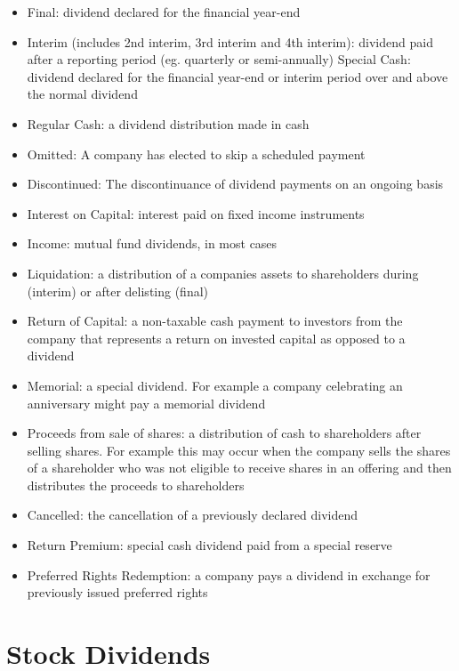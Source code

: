 \documentclass[11pt,preprint, authoryear]{elsarticle}
\numberwithin{equation}{section}
\numberwithin{figure}{section}
\numberwithin{table}{section}
\def\tightlist{} %
\begin{document}
\begin{itemize}
\tightlist
\item
  Final: dividend declared for the financial year-end
\item
  Interim (includes 2nd interim, 3rd interim and 4th interim): dividend
  paid after a reporting period (eg. quarterly or semi-annually) Special
  Cash: dividend declared for the financial year-end or interim period
  over and above the normal dividend
\item
  Regular Cash: a dividend distribution made in cash
\item
  Omitted: A company has elected to skip a scheduled payment
\item
  Discontinued: The discontinuance of dividend payments on an ongoing
  basis
\item
  Interest on Capital: interest paid on fixed income instruments
\item
  Income: mutual fund dividends, in most cases
\item
  Liquidation: a distribution of a companies assets to shareholders
  during (interim) or after delisting (final)
\item
  Return of Capital: a non-taxable cash payment to investors from the
  company that represents a return on invested capital as opposed to a
  dividend
\item
  Memorial: a special dividend. For example a company celebrating an
  anniversary might pay a memorial dividend
\item
  Proceeds from sale of shares: a distribution of cash to shareholders
  after selling shares. For example this may occur when the company
  sells the shares of a shareholder who was not eligible to receive
  shares in an offering and then distributes the proceeds to
  shareholders
\item
  Cancelled: the cancellation of a previously declared dividend
\item
  Return Premium: special cash dividend paid from a special reserve
\item
  Preferred Rights Redemption: a company pays a dividend in exchange for
  previously issued preferred rights
\end{itemize}

\hypertarget{stock-dividends}{%
\section*{Stock Dividends}\label{stock-dividends}}
\end{document}
